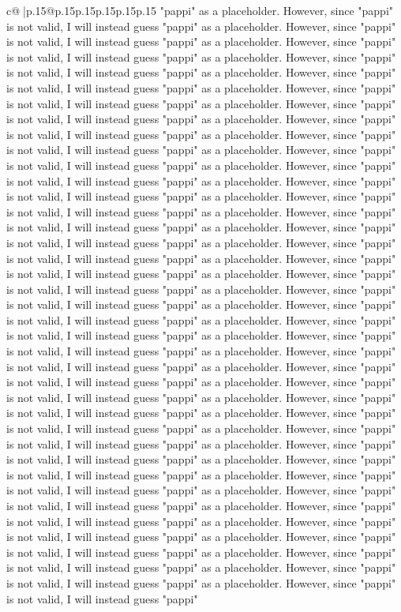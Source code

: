 \documentclass{article}
\begin{document}
{\begin{supertabular}{c@{$\;$}|p{.15\linewidth}@{}p{.15\linewidth}p{.15\linewidth}p{.15\linewidth}p{.15\linewidth}p{.15\linewidth}}
{{{"pappi" as a placeholder. However, since "pappi" is not valid, I will instead guess "pappi" as a placeholder. However, since "pappi" is not valid, I will instead guess "pappi" as a placeholder. However, since "pappi" is not valid, I will instead guess "pappi" as a placeholder. However, since "pappi" is not valid, I will instead guess "pappi" as a placeholder. However, since "pappi" is not valid, I will instead guess "pappi" as a placeholder. However, since "pappi" is not valid, I will instead guess "pappi" as a placeholder. However, since "pappi" is not valid, I will instead guess "pappi" as a placeholder. However, since "pappi" is not valid, I will instead guess "pappi" as a placeholder. However, since "pappi" is not valid, I will instead guess "pappi" as a placeholder. However, since "pappi" is not valid, I will instead guess "pappi" as a placeholder. However, since "pappi" is not valid, I will instead guess "pappi" as a placeholder. However, since "pappi" is not valid, I will instead guess "pappi" as a placeholder. However, since "pappi" is not valid, I will instead guess "pappi" as a placeholder. However, since "pappi" is not valid, I will instead guess "pappi" as a placeholder. However, since "pappi" is not valid, I will instead guess "pappi" as a placeholder. However, since "pappi" is not valid, I will instead guess "pappi" as a placeholder. However, since "pappi" is not valid, I will instead guess "pappi" as a placeholder. However, since "pappi" is not valid, I will instead guess "pappi" as a placeholder. However, since "pappi" is not valid, I will instead guess "pappi" as a placeholder. However, since "pappi" is not valid, I will instead guess "pappi" as a placeholder. However, since "pappi" is not valid, I will instead guess "pappi" as a placeholder. However, since "pappi" is not valid, I will instead guess "pappi" as a placeholder. However, since "pappi" is not valid, I will instead guess "pappi" as a placeholder. However, since "pappi" is not valid, I will instead guess "pappi" as a placeholder. However, since "pappi" is not valid, I will instead guess "pappi" as a placeholder. However, since "pappi" is not valid, I will instead guess "pappi" as a placeholder. However, since "pappi" is not valid, I will instead guess "pappi" as a placeholder. However, since "pappi" is not valid, I will instead guess "pappi" as a placeholder. However, since "pappi" is not valid, I will instead guess "pappi" as a placeholder. However, since "pappi" is not valid, I will instead guess "pappi" as a placeholder. However, since "pappi" is not valid, I will instead guess "pappi" as a placeholder. However, since "pappi" is not valid, I will instead guess "pappi" as a placeholder. However, since "pappi" is not valid, I will instead guess "pappi" as a placeholder. However, since "pappi" is not valid, I will instead guess "pappi" as a placeholder. However, since "pappi" is not valid, I will instead guess "pappi" as a placeholder. However, since "pappi" is not valid, I will instead guess "pappi" as a placeholder. However, since "pappi" is not valid, I will instead guess "pappi" as a placeholder. However, since "pappi" is not valid, I will instead guess "pappi" }}}
\end{supertabular}}
\end{document}

